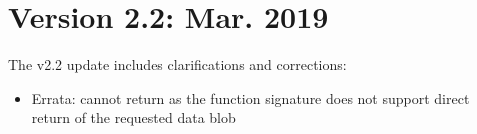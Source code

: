 \section{Version 2.2: Mar. 2019}

The v2.2 update includes clarifications and corrections:

\begin{itemize}
    \item Errata:  cannot return  as the function signature does not support direct return of the requested data blob
\end{itemize}
